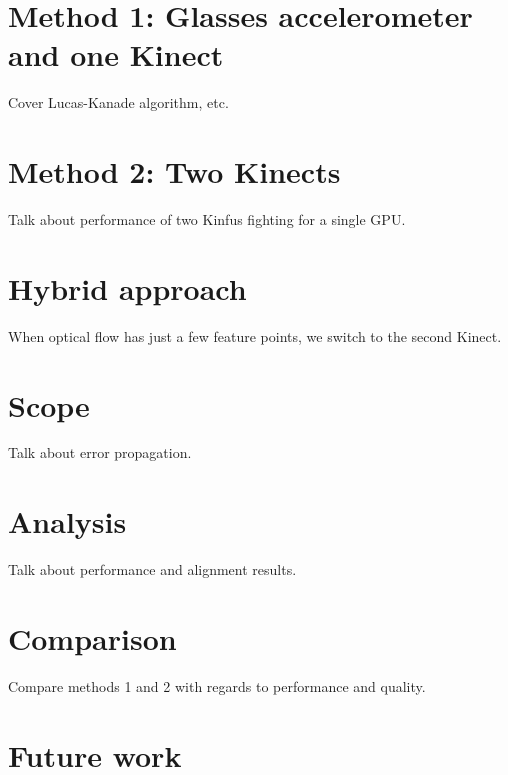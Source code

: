 \documentclass[msc, a4paper, classic, en]{ufbathesis}
\begin{document}
\section{Method 1: Glasses accelerometer and one Kinect}
Cover Lucas-Kanade algorithm, etc.
\section{Method 2: Two Kinects}
Talk about performance of two Kinfus fighting for a single GPU.
\section{Hybrid approach}
When optical flow has just a few feature points, we switch to the second Kinect.

\section{Scope}
Talk about error propagation.
\section{Analysis}
Talk about performance and alignment results.
\section{Comparison}
Compare methods 1 and 2 with regards to performance and quality.

\section{Future work}

\backmatter

\appendix

% 
% 
% 





\end{document}
